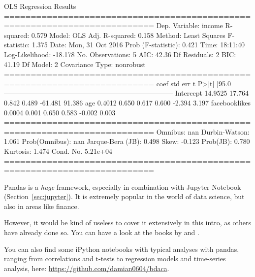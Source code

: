 \documentclass[a4paper,12pt]{book}
\begin{document}
\begin{lstlistingoutput}
OLS Regression Results                            
==========================================================================
Dep. Variable:                 income   R-squared:                       0.579
Model:                            OLS   Adj. R-squared:                  0.158
Method:                 Least Squares   F-statistic:                     1.375
Date:                Mon, 31 Oct 2016   Prob (F-statistic):              0.421
Time:                        18:11:40   Log-Likelihood:                -18.178
No. Observations:                   5   AIC:                             42.36
Df Residuals:                       2   BIC:                             41.19
Df Model:                           2                                         
Covariance Type:            nonrobust                                         
==========================================================================
coef    std err          t      P>|t|      [95.0%
--------------------------------------------------------------------------
Intercept        14.9525     17.764      0.842      0.489       -61.481    91.386
age               0.4012      0.650      0.617      0.600        -2.394     3.197
facebooklikes     0.0004      0.001      0.650      0.583        -0.002     0.003
==========================================================================
Omnibus:                          nan   Durbin-Watson:                   1.061
Prob(Omnibus):                    nan   Jarque-Bera (JB):                0.498
Skew:                          -0.123   Prob(JB):                        0.780
Kurtosis:                       1.474   Cond. No.                     5.21e+04
==========================================================================
\end{lstlistingoutput}

Pandas is a \emph{huge} framework, especially in combination with Jupyter Notebook (Section~\ref{sec:jupyter}). It is extremely popular in the world of data science, but also in areas like finance. 

However, it would be kind of useless to cover it extensively in this intro, as others have already done so. You can have a look at the books by \cite{McKinney2012} and  \cite{Russel2013}. 

You can also find some iPython notebooks with typical analyses with pandas, ranging from correlations and t-tests to regression models and time-series analysis, here: \url{https://github.com/damian0604/bdaca}. 
\end{document}
